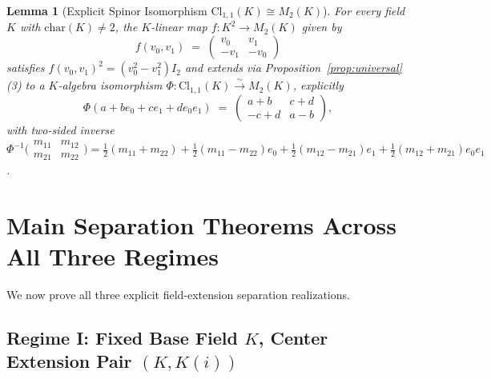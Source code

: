 \documentclass[11pt,a4paper]{article}
\theoremstyle{plain}
\newtheorem{lemma}[theorem]{Lemma}
\theoremstyle{definition}
\newcommand{\Cl}{\mathrm{Cl}}
\newcommand{\Mat}{M}
\begin{document}
\begin{lemma}[Explicit Spinor Isomorphism $\Cl_{1,1}(K) \cong \Mat_2(K)$]\label{lem:cl11}
For every field $K$ with $\mathrm{char}(K) \neq 2$, the $K$-linear map $f : K^2 \to \Mat_2(K)$ given by
\begin{equation}\label{eq:spinor-map}
  f(v_0, v_1) \;=\; \begin{pmatrix} v_0 & v_1 \\ -v_1 & -v_0 \end{pmatrix}
\end{equation}
satisfies $f(v_0, v_1)^2 = (v_0^2 - v_1^2) I_2$ and extends via Proposition~\ref{prop:universal}(3) to a $K$-algebra isomorphism $\Phi : \Cl_{1,1}(K) \xrightarrow{\sim} \Mat_2(K)$, explicitly
\[
  \Phi(a + b e_0 + c e_1 + d e_0 e_1)
  \;=\;
  \begin{pmatrix} a + b & c + d \\ -c + d & a - b \end{pmatrix},
\]
with two-sided inverse $\Phi^{-1}\bigl(\begin{smallmatrix}m_{11}&m_{12}\\m_{21}&m_{22}\end{smallmatrix}\bigr) = \frac{1}{2}(m_{11}+m_{22}) + \frac{1}{2}(m_{11}-m_{22}) e_0 + \frac{1}{2}(m_{12}-m_{21}) e_1 + \frac{1}{2}(m_{12}+m_{21}) e_0 e_1$.
\end{lemma}

\section{Main Separation Theorems Across All Three Regimes}

We now prove all three explicit field-extension separation realizations.

\subsection{Regime I: Fixed Base Field \texorpdfstring{$K$}{K}, Center Extension Pair \texorpdfstring{$(K, K(i))$}{(K, K(i))}}
\end{document}
